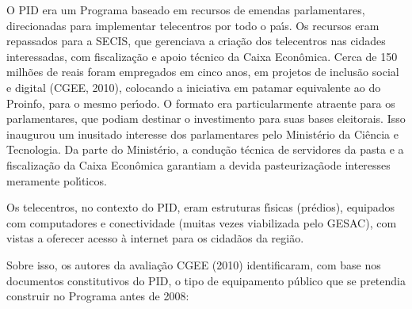 \documentclass[
12pt,		%
openright,	%
twoside,  %
a4paper,			%
chapter=TITLE,		%
english,			%
french,				%
spanish,			%
brazil				%
]{USPSC-classe/USPSC}
\begin{document}
O PID era um Programa baseado em recursos de emendas parlamentares, direcionadas para implementar telecentros por todo o pa\'{\i}s. Os recursos eram repassados para a SECIS, que gerenciava a cria\c{c}\~ao dos telecentros nas cidades interessadas, com fiscaliza\c{c}\~ao e apoio t\'ecnico da Caixa Econ\^omica. Cerca de 150 milh\~oes de reais foram empregados em cinco anos, em projetos de inclus\~ao social e digital (CGEE, 2010), colocando a iniciativa em patamar equivalente ao do Proinfo, para o mesmo per\'{\i}odo. O formato era particularmente atraente para os parlamentares, que podiam destinar o investimento para suas bases eleitorais. Isso inaugurou um inusitado interesse dos parlamentares pelo Minist\'erio da Ci\^encia e Tecnologia. Da parte do Minist\'erio, a condu\c{c}\~ao t\'ecnica de servidores da pasta e a fiscaliza\c{c}\~ao da Caixa Econ\^omica garantiam a devida \textquotedbl pasteuriza\c{c}\~ao\textquotedbl  de interesses meramente pol\'{\i}ticos.

















Os telecentros, no contexto do PID, eram estruturas f\'{\i}sicas (pr\'edios), equipados com computadores e conectividade (muitas vezes viabilizada pelo GESAC), com vistas a oferecer acesso \`a internet para os cidad\~aos da regi\~ao.

















Sobre isso, os autores da avalia\c{c}\~ao CGEE (2010) identificaram, com base nos documentos constitutivos do PID, o tipo de equipamento p\'ublico que se pretendia construir no Programa antes de 2008:


















\noindent\begin{center}\mbox{\centering{}}\end{center}
\end{document}
